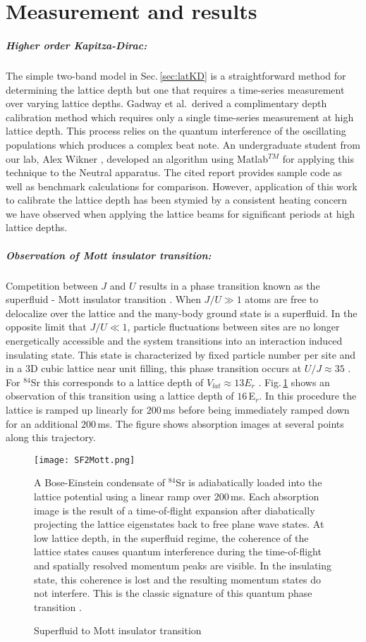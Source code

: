 \section{Measurement and results}
\subparagraph{Higher order Kapitza-Dirac:}
The simple two-band model in Sec.\,\ref{sec:latKD} is a straightforward method for determining the lattice depth but one that requires a time-series measurement over varying lattice depths.
Gadway et al.\,\cite{Gadway2009} derived a complimentary depth calibration method which requires only a single time-series measurement at high lattice depth.
This process relies on the quantum interference of the oscillating populations which produces a complex beat note.
An undergraduate student from our lab, Alex Wikner \cite{Wikner2017}, developed an algorithm using Matlab$^{TM}$ for applying this technique to the Neutral apparatus.
The cited report provides sample code as well as benchmark calculations for comparison.
However, application of this work to calibrate the lattice depth has been stymied by a consistent heating concern we have observed when applying the lattice beams for significant periods at high lattice depths.

\subparagraph{Observation of Mott insulator transition:}
Competition between $J$ and $U$ results in a phase transition known as the superfluid - Mott insulator transition \cite{Fisher1989,gme02}.
When $J/U \gg 1$ atoms are free to delocalize over the lattice and the many-body ground state is a superfluid.
In the opposite limit that $J/U \ll 1$, particle fluctuations between sites are no longer energetically accessible and the system transitions into an interaction induced insulating state.
This state is characterized by fixed particle number per site and in a 3D cubic lattice near unit filling, this phase transition occurs at $U/J \approx 35$ \cite{Blakie2004}.
For $^{84}$Sr this corresponds to a lattice depth of $V_{lat} \approx 13E_r$ \cite{Fisher1989}.
Fig.\,\ref{fig:mottSFTransition} shows an observation of this transition using a lattice depth of $16$\,E$_r$.
In this procedure the lattice is ramped up linearly for $200\,$ms before being immediately ramped down for an additional $200\,$ms.
The figure shows absorption images at several points along this trajectory.
	\begin{figure} 
		\centerline{
		\texttt{[image: SF2Mott.png]}}
		\caption{Superfluid to Mott insulator transition}{A Bose-Einstein condensate of $^{84}$Sr is adiabatically loaded into the lattice potential using a linear ramp over $200$\,ms. Each absorption image is the result of a time-of-flight expansion after diabatically projecting the lattice eigenstates back to free plane wave states. At low lattice depth, in the superfluid regime, the coherence of the lattice states causes quantum interference during the time-of-flight and spatially resolved momentum peaks are visible. In the insulating state, this coherence is lost and the resulting momentum states do not interfere. This is the classic signature of this quantum phase transition \cite{gme02,gmh02}.}
		\label{fig:mottSFTransition}
	\end{figure}


